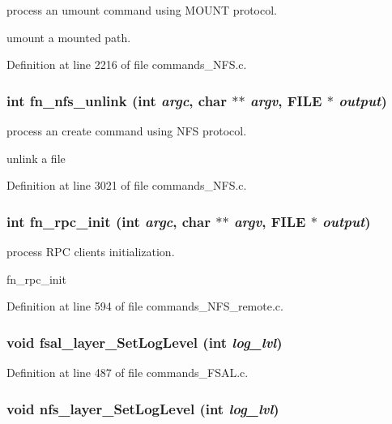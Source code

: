 process an umount command using MOUNT protocol.

umount a mounted path. 

Definition at line 2216 of file commands\_\-NFS.c.
\subsubsection[{fn\_\-nfs\_\-unlink}]{\setlength{\rightskip}{0pt plus 5cm}int fn\_\-nfs\_\-unlink (int {\em argc}, \/  char $\ast$$\ast$ {\em argv}, \/  FILE $\ast$ {\em output})}\label{commands_8h_a154fe7fc1c4ab72505656deab8feb85}


process an create command using NFS protocol.

unlink a file 

Definition at line 3021 of file commands\_\-NFS.c.
\subsubsection[{fn\_\-rpc\_\-init}]{\setlength{\rightskip}{0pt plus 5cm}int fn\_\-rpc\_\-init (int {\em argc}, \/  char $\ast$$\ast$ {\em argv}, \/  FILE $\ast$ {\em output})}\label{commands_8h_4e73bacfb224496a2393bbc05ced1d76}


process RPC clients initialization.

fn\_\-rpc\_\-init 

Definition at line 594 of file commands\_\-NFS\_\-remote.c.
\subsubsection[{fsal\_\-layer\_\-SetLogLevel}]{\setlength{\rightskip}{0pt plus 5cm}void fsal\_\-layer\_\-SetLogLevel (int {\em log\_\-lvl})}\label{commands_8h_8d06115f7aed032f29bab10e1bafc79e}




Definition at line 487 of file commands\_\-FSAL.c.
\subsubsection[{nfs\_\-layer\_\-SetLogLevel}]{\setlength{\rightskip}{0pt plus 5cm}void nfs\_\-layer\_\-SetLogLevel (int {\em log\_\-lvl})}\label{commands_8h_b887a5c5a0911df2c6be04b92c3a9693}




